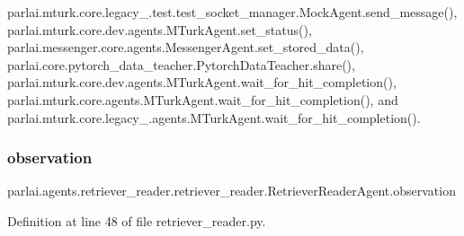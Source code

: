 parlai.\+mturk.\+core.\+legacy\+\_.\+test.\+test\+\_\+socket\+\_\+manager.\+Mock\+Agent.\+send\+\_\+message(), parlai.\+mturk.\+core.\+dev.\+agents.\+M\+Turk\+Agent.\+set\+\_\+status(), parlai.\+messenger.\+core.\+agents.\+Messenger\+Agent.\+set\+\_\+stored\+\_\+data(), parlai.\+core.\+pytorch\+\_\+data\+\_\+teacher.\+Pytorch\+Data\+Teacher.\+share(), parlai.\+mturk.\+core.\+dev.\+agents.\+M\+Turk\+Agent.\+wait\+\_\+for\+\_\+hit\+\_\+completion(), parlai.\+mturk.\+core.\+agents.\+M\+Turk\+Agent.\+wait\+\_\+for\+\_\+hit\+\_\+completion(), and parlai.\+mturk.\+core.\+legacy\+\_.\+agents.\+M\+Turk\+Agent.\+wait\+\_\+for\+\_\+hit\+\_\+completion().

\mbox{\label{classparlai_1_1agents_1_1retriever__reader_1_1retriever__reader_1_1RetrieverReaderAgent_ab93ead9cf1fcab11b471b9e025b5652c}} 
\subsubsection{\texorpdfstring{observation}{observation}}
{\footnotesize\ttfamily parlai.\+agents.\+retriever\+\_\+reader.\+retriever\+\_\+reader.\+Retriever\+Reader\+Agent.\+observation}



Definition at line 48 of file retriever\+\_\+reader.\+py.



